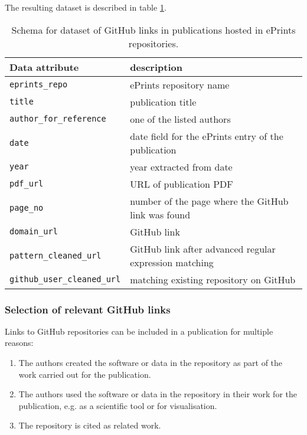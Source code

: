 \documentclass[10pt,a4paper]{scrartcl}
\begin{document}
The resulting dataset is described in table \ref{table:github_eprints}.

\begin{table}
    \begin{tabular}{|l|l|}
        \hline
        Data attribute & description \\
        \hline 
        \verb|eprints_repo| & ePrints repository name\\
        \verb|title| & publication title\\
        \verb|author_for_reference| & one of the listed authors\\
        \verb|date| & date field for the ePrints entry of the publication\\
        \verb|year| & year extracted from date\\
        \verb|pdf_url| & URL of publication PDF\\
        \verb|page_no| & number of the page where the GitHub link was found\\
        \verb|domain_url| & GitHub link\\
        \verb|pattern_cleaned_url| & GitHub link after advanced regular expression matching\\
        \verb|github_user_cleaned_url| & matching existing repository on GitHub\\
        \hline
    \end{tabular}
    \caption{Schema for dataset of GitHub links in publications hosted in ePrints repositories.}
    \label{table:github_eprints}
\end{table}

\subsubsection*{Selection of relevant GitHub links}
\label{section:select_links}

Links to GitHub repositories can be included in a publication for multiple reasons:
\begin{enumerate}
    \item The authors created the software or data in the repository as part of the work carried out for the publication.
    \item The authors used the software or data in the repository in their work for the publication, e.g. as a scientific tool or for visualisation.
    \item The repository is cited as related work.
\end{enumerate}
\end{document}
